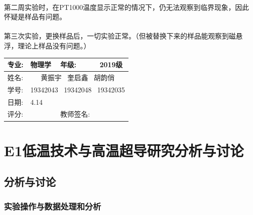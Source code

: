 \documentclass{ctexart}
\newcommand{\experimentname}{E1低温技术与高温超导研究}
\newcommand{\student}{黄振宇  \ 奎启鑫 \ 胡韵俏}
\newcommand{\Grade}{2019级}
\newcommand{\stuID}{19342043  \ 19342048 \ 19342035}
\newcommand{\reviewdate}{4.14}
\theoremstyle{ansstyle}
\newcommand{\reviewdata}{%
	\begin{center}
		\begin{tabular}{|p{2cm}|p{4cm}|p{4cm}|p{4cm}|}
			\hline
			专业: & 物理学 & 年级:  & \Grade \\
			\hline
			姓名:  & \multicolumn{3}{c|}{\student} \\
			\hline 
			学号:  & \multicolumn{3}{c|}{\stuID} \\
			\hline
			日期: & \reviewdate & & \\
			\hline
			评分: & & 教师签名: & \\
			\hline
		\end{tabular}
	\end{center}%
}
\begin{document}
\paragraph{}第二周实验时，在PT1000温度显示正常的情况下，仍无法观察到临界现象，因此怀疑是样品有问题。
\paragraph{}第三次实验，更换样品后，一切实验正常。（但被替换下来的样品能观察到磁悬浮，理论上样品没有问题。）

\newpage


\reviewdata

\section*{\experimentname 分析与讨论}


\subsection{分析与讨论}
\subsubsection{实验操作与数据处理和分析}
\end{document}
